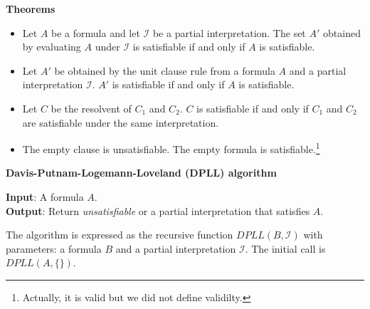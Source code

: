 \documentclass[11pt]{report}
\begin{document}
\begin{center}
\textbf{Theorems}
\end{center}

\begin{itemize}
\item Let $A$ be a formula and let $\mathcal{I}$ be a partial
interpretation. The set $A'$ obtained by evaluating $A$ under
$\mathcal{I}$ is satisfiable if and only if $A$ is satisfiable.

\item Let $A'$ be obtained by the unit clause rule from a formula $A$
and a partial interpretation $\mathcal{I}$. $A'$ is satisfiable if and
only if $A$ is satisfiable.

\item Let $C$ be the resolvent of $C_1$ and $C_2$. $C$ is satisfiable if
and only if $C_1$ and $C_2$ are satisfiable under the same
interpretation.

\item The empty clause is unsatisfiable. The empty formula is
satisfiable.\footnote{Actually, it is valid but we did not define
validilty.}

\end{itemize}

\newpage

\begin{center}
\textbf{Davis-Putnam-Logemann-Loveland (DPLL) algorithm}
\end{center}

\textbf{Input}: A formula $A$.\\
\textbf{Output}: Return \emph{unsatisfiable} or a partial interpretation
that satisfies $A$.

The algorithm is expressed as the recursive function
$\textit{DPLL}(B,\mathcal{I})$ with parameters: a formula $B$ and a
partial interpretation $\mathcal{I}$. The initial call is
$\textit{DPLL}(A,\{\})$. 

\medskip
\end{document}
